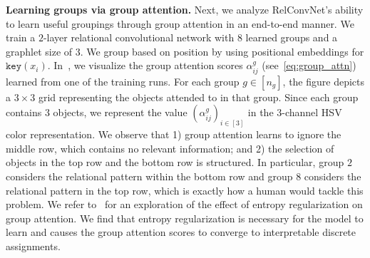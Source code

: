 \textbf{Learning groups via group attention.} Next, we analyze RelConvNet's ability to learn useful groupings through group attention in an end-to-end manner. We train a $2$-layer relational convolutional network with $8$ learned groups and a graphlet size of $3$. We group based on position by using positional embeddings for $\mathtt{key}(x_i)$.
In~, we visualize the group attention scores $\alpha_{ij}^g$ (see~\cref{eq:group_attn}) learned from one of the training runs. For each group $g \in [n_g]$, the figure depicts a $3 \times 3$ grid representing the objects attended to in that group. Since each group contains $3$ objects, we represent the value $(\alpha_{ij}^g)_{i \in [3]}$ in the $3$-channel HSV color representation. We observe that 1) group attention learns to ignore the middle row, which contains no relevant information; and 2) the selection of objects in the top row and the bottom row is structured. In particular, group $2$ considers the relational pattern within the bottom row and group $8$ considers the relational pattern in the top row, which is exactly how a human would tackle this problem. We refer to~ for an exploration of the effect of entropy regularization on group attention. We find that entropy regularization is necessary for the model to learn and causes the group attention scores to converge to interpretable discrete assignments.
